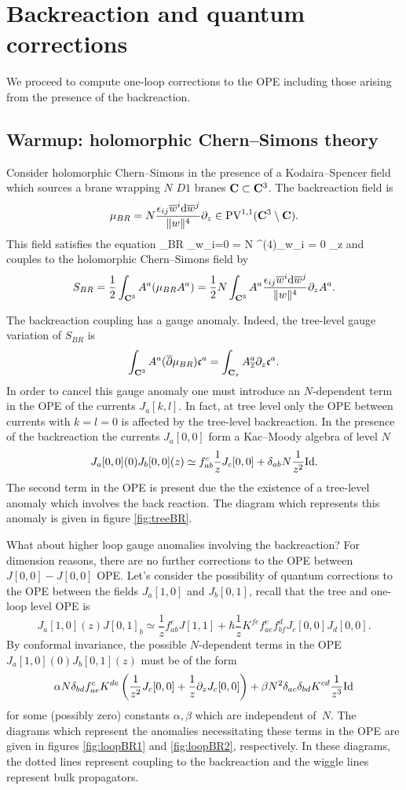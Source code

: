 \documentclass[../main.tex]{subfiles}
\begin{document}
\section{Backreaction and quantum corrections}
\label{sec:br}

We proceed to compute one-loop corrections to the OPE including those arising from the presence of the backreaction. 

\subsection{Warmup: holomorphic Chern--Simons theory}

Consider holomorphic Chern--Simons in the presence of a Kodaira--Spencer field which sources a brane wrapping $N$ $D1$ branes $\mathbf{C} \subset \mathbf{C}^3$. 
The backreaction field is 
\[
\mu_{BR} = N \frac{{\epsilon}_{ij} \overline{w}^i \mathrm{d} \overline{w}^j}{\|w\|^4} \partial_z \in {\rm PV}^{1,1} (\mathbf{C}^3 \setminus \mathbf{C}) . 
\]
This field satisfies the equation
\beqn\label{eqn:csBR}
\dbar \mu_{BR} \wedge \Omega_{w_i=0} = N \delta^{(4)}_{w_i = 0} \del_z 
\eeqn
and couples to the holomorphic Chern--Simons field by 
\[
S_{BR} = \frac12 \int_{\mathbf{C}^3} A^a (\mu_{BR} A^a) = \frac12 N \int_{\mathbf{C}^3} A^a \frac{{\epsilon}_{ij} \overline{w}^i \mathrm{d} \overline{w}^j}{\|w\|^4} \partial_z A^a .
\]

The backreaction coupling has a gauge anomaly. 
Indeed, the tree-level gauge variation of $S_{BR}$ is
\[
\int_{\mathbf{C}^3} A^a (\overline{\partial} \mu_{BR}) \mathfrak{c}^a = \int_{\mathbf{C}_z} A_{{\overline{z}}}^a \partial_z \mathfrak{c}^a .
\]
In order to cancel this gauge anomaly one must introduce an $N$-dependent term in the OPE of the currents $J_a[k,l]$. 
In fact, at tree level only the OPE between currents with $k=l=0$ 
is affected by the tree-level backreaction.
In the presence of the backreaction the currents $J_a[0,0]$ form a Kac--Moody algebra of level $N$
\[
J_a[0,0] (0) J_b [0,0] (z) \simeq f_{ab}^c \frac1z J_c[0,0] + \delta_{ab} N \frac1{z^2} {\rm Id} .
\]
The second term in the OPE is present due the the existence of a tree-level anomaly which involves the back reaction.
The diagram which represents this anomaly is given in figure \ref{fig:treeBR}.

What about higher loop gauge anomalies involving the backreaction?
For dimension reasons, there are no further corrections to the OPE between $J[0,0]-J[0,0]$ OPE.
Let's consider the possibility of quantum corrections to the OPE between the fields $J_a[1,0]$ and $J_b[0,1]$, recall that the tree and one-loop level OPE is 
\[
J_a[1,0](z) J[0,1]_b \simeq \frac{1}{z} f^c_{ab} J[1,1] + \hbar \frac1z K^{fe} f_{ae}^c f_{bf}^d J_c[0,0] J_d[0,0] .
\]
By conformal invariance, the possible $N$-dependent terms in the OPE $J_a[1,0] (0) J_b [0,1](z)$ must be of the form
\[
\alpha N \delta_{bd} f^c_{ae} K^{de}  \left(\frac{1}{z^2} J_c[0,0] + \frac{1}{z} \partial_z J_c[0,0] \right) + \beta N^2 \delta_{ac} \delta_{bd} K^{cd} \frac{1}{z^3} {\rm Id} 
\]
for some (possibly zero) constants $\alpha,\beta$ which are independent of~$N$.
The diagrams which represent the anomalies necessitating these terms in the OPE are given in figures \ref{fig:loopBR1} and \ref{fig:loopBR2}, respectively.
In these diagrams, the dotted lines represent coupling to the backreaction and the wiggle lines represent bulk propagators.
\end{document}
